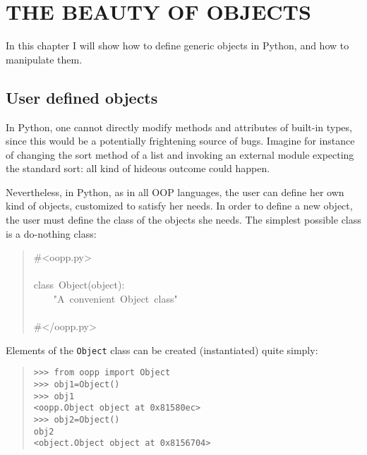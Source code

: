 \documentclass[10pt,english]{article}
\begin{document}
\hypertarget{the-beauty-of-objects}{}
\section*{THE BEAUTY OF OBJECTS}

In this chapter I will show how to define generic objects in Python, and
how to manipulate them.



\hypertarget{user-defined-objects}{}
\subsection*{User defined objects}

In Python, one cannot directly modify methods and attributes of built-in 
types, since this would be a potentially frightening source of bugs. 
Imagine for instance of changing the sort method of a list and invoking an 
external module expecting the standard sort: all kind of hideous outcome 
could happen.

Nevertheless, in Python, as in all OOP languages, the user can define 
her own kind of objects, customized to satisfy her needs. In order to
define a new object, the user must define the class of the objects she 
needs. The simplest possible class is a do-nothing class:
\begin{quote}
\begin{ttfamily}\begin{flushleft}
\mbox{{\#}<oopp.py>}\\
\mbox{}\\
\mbox{class~Object(object):}\\
\mbox{~~~~"A~convenient~Object~class"}\\
\mbox{}\\
\mbox{{\#}</oopp.py>}
\end{flushleft}\end{ttfamily}
\end{quote}

Elements of the \texttt{Object} class can be created (instantiated) quite
simply:
\begin{quote}
\begin{verbatim}>>> from oopp import Object
>>> obj1=Object()
>>> obj1
<oopp.Object object at 0x81580ec>
>>> obj2=Object()
obj2
<object.Object object at 0x8156704>\end{verbatim}
\end{quote}
\end{document}
